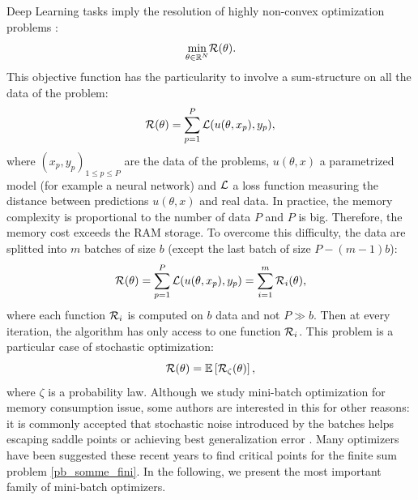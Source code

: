 Deep Learning tasks \cite{image_recognition,language_recognition,plasma} imply the resolution of highly non-convex optimization problems \cite{DL_opti}:
\begin{equation*}
\displaystyle{\min_{\theta \in \mathbb{R}^N}} \mathcal{R}(\theta).
\end{equation*}
This objective function has the particularity to involve a sum-structure on all the data of the problem:
\begin{equation*}
	\mathcal{R}(\theta) = \displaystyle{\sum_{p=1}^{P} \mathcal{L}(u(\theta,x_p), y_p)},
\end{equation*}
where $(x_p,y_p)_{1\leq p \leq P}$ are the data of the problems, $u(\theta,x)$ a parametrized model (for example a neural network) and $\mathcal{L}$ a loss function measuring the distance between predictions $u(\theta,x)$ and real data. In practice, the memory complexity is proportional to the number of data $P$ and $P$ is big. Therefore, the memory cost exceeds the RAM storage. To overcome this difficulty, the data are splitted into $m$ batches of size $b$ (except the last batch of size $P-(m-1)b$):
\begin{equation}
	\mathcal{R}(\theta) = \displaystyle{\sum_{p=1}^{P} \mathcal{L}(u(\theta,x_p), y_p)} = \sum_{i=1}^m \mathcal{R}_i(\theta),
	\label{pb_somme_fini}
\end{equation}
where each function $\mathcal{R}_i$ is computed on $b$ data and not $P \gg b$. Then at every iteration, the algorithm has only access to one function $\mathcal{R}_i$. This problem is a particular case of stochastic optimization:
\begin{equation}
	\mathcal{R}(\theta) = \mathbb{E} \left[\mathcal{R}_{\zeta}(\theta)\right],
	\label{opti_sto}
\end{equation}  
where $\zeta$ is a probability law. Although we study mini-batch optimization for memory consumption issue, some authors are interested in this for other reasons: it is commonly accepted that stochastic noise introduced by the batches helps escaping saddle points \cite{sgd_escape1,sgd_escape2,sgd_escape3,sgd_escape4} or achieving best generalization error \cite{sgd_gen1,sgd_gen2,sgd_gen3,sgd_gen4}. Many optimizers have been suggested these recent years to find critical points for the finite sum problem \eqref{pb_somme_fini}. In the following, we present the most important family of mini-batch optimizers.

